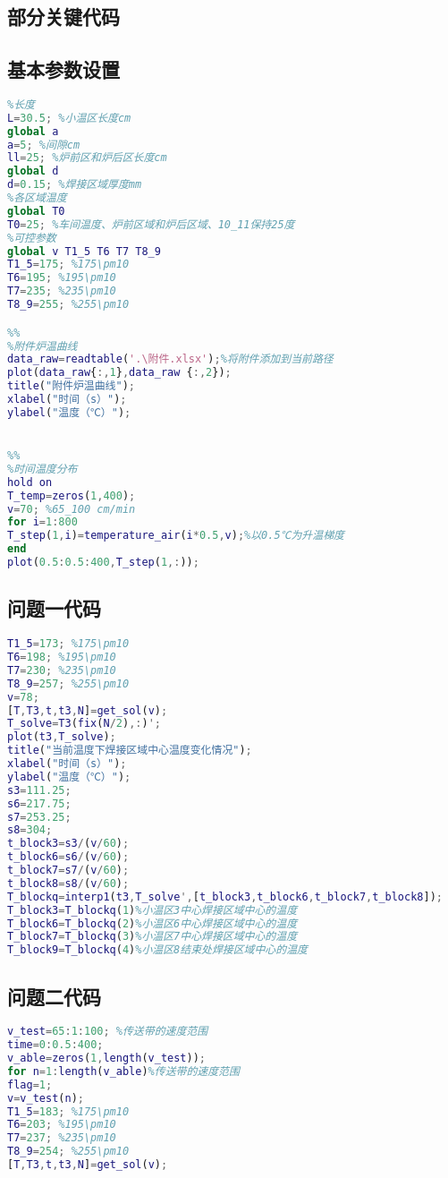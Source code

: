 \documentclass[withoutpreface,bwprint]{cumcmthesis} %
\begin{document}
\newpage
\begin{appendices}
\section{部分关键代码}
\subsection{基本参数设置}


\begin{lstlisting}[language=matlab]
%基本参数设置
%长度
L=30.5; %小温区长度cm
global a
a=5; %间隙cm
ll=25; %炉前区和炉后区长度cm
global d
d=0.15; %焊接区域厚度mm
%各区域温度
global T0
T0=25; %车间温度、炉前区域和炉后区域、10_11保持25度
%可控参数
global v T1_5 T6 T7 T8_9
T1_5=175; %175\pm10
T6=195; %195\pm10
T7=235; %235\pm10
T8_9=255; %255\pm10

%%
%附件炉温曲线
data_raw=readtable('.\附件.xlsx');%将附件添加到当前路径
plot(data_raw{:,1},data_raw {:,2});
title("附件炉温曲线");
xlabel("时间（s）");
ylabel("温度（℃）");


%%
%时间温度分布
hold on
T_temp=zeros(1,400);
v=70; %65_100 cm/min
for i=1:800
T_step(1,i)=temperature_air(i*0.5,v);%以0.5℃为升温梯度
end
plot(0.5:0.5:400,T_step(1,:));
 \end{lstlisting}
 
\subsection{问题一代码}
\begin{lstlisting}[language=matlab]
%问题一
T1_5=173; %175\pm10
T6=198; %195\pm10
T7=230; %235\pm10
T8_9=257; %255\pm10
v=78;
[T,T3,t,t3,N]=get_sol(v);
T_solve=T3(fix(N/2),:)';
plot(t3,T_solve);
title("当前温度下焊接区域中心温度变化情况");
xlabel("时间（s）");
ylabel("温度（℃）");
s3=111.25;
s6=217.75;
s7=253.25;
s8=304;
t_block3=s3/(v/60);
t_block6=s6/(v/60);
t_block7=s7/(v/60);
t_block8=s8/(v/60);
T_blockq=interp1(t3,T_solve',[t_block3,t_block6,t_block7,t_block8]);
T_block3=T_blockq(1)%小温区3中心焊接区域中心的温度
T_block6=T_blockq(2)%小温区6中心焊接区域中心的温度
T_block7=T_blockq(3)%小温区7中心焊接区域中心的温度
T_block9=T_blockq(4)%小温区8结束处焊接区域中心的温度
\end{lstlisting}

\subsection{问题二代码}
\begin{lstlisting}[language=matlab]
v_test=65:1:100; %传送带的速度范围
time=0:0.5:400;
v_able=zeros(1,length(v_test));
for n=1:length(v_able)%传送带的速度范围
flag=1;
v=v_test(n);
T1_5=183; %175\pm10
T6=203; %195\pm10
T7=237; %235\pm10
T8_9=254; %255\pm10
[T,T3,t,t3,N]=get_sol(v);


\end{lstlisting}
\end{appendices}
\end{document}
